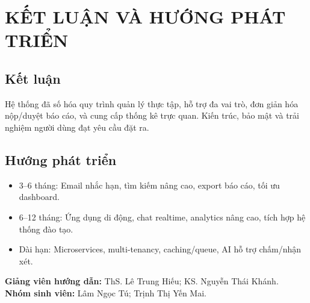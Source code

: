 \chapter{KẾT LUẬN VÀ HƯỚNG PHÁT TRIỂN}

\section{Kết luận}
Hệ thống đã số hóa quy trình quản lý thực tập, hỗ trợ đa vai trò, đơn giản hóa nộp/duyệt báo cáo, và cung cấp thống kê trực quan. Kiến trúc, bảo mật và trải nghiệm người dùng đạt yêu cầu đặt ra.

\section{Hướng phát triển}
\begin{itemize}
  \item 3–6 tháng: Email nhắc hạn, tìm kiếm nâng cao, export báo cáo, tối ưu dashboard.
  \item 6–12 tháng: Ứng dụng di động, chat realtime, analytics nâng cao, tích hợp hệ thống đào tạo.
  \item Dài hạn: Microservices, multi-tenancy, caching/queue, AI hỗ trợ chấm/nhận xét.
\end{itemize}

\vspace{1cm}
\noindent\textbf{Giảng viên hướng dẫn:} ThS. Lê Trung Hiếu; KS. Nguyễn Thái Khánh.\\
\textbf{Nhóm sinh viên:} Lâm Ngọc Tú; Trịnh Thị Yến Mai.

